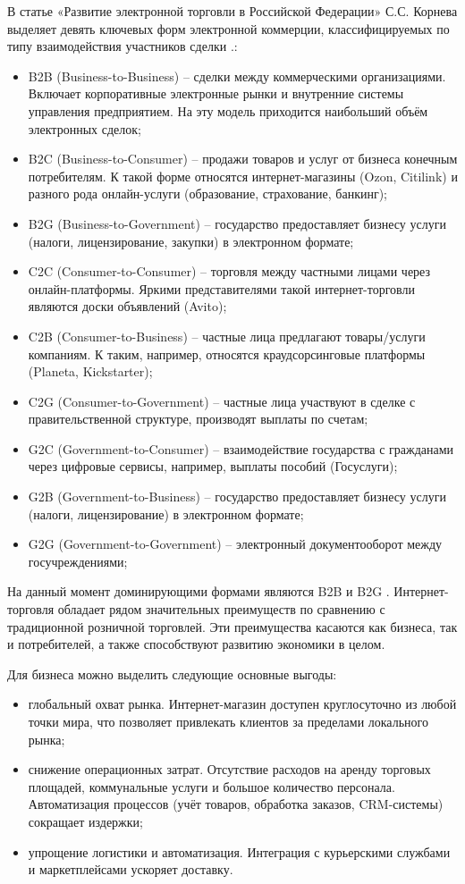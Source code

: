 В статье «Развитие электронной торговли в Российской Федерации» С.С. Корнева выделяет девять ключевых форм электронной коммерции, классифицируемых по типу взаимодействия участников сделки \cite{2}.:
\begin{itemize}
	\item B2B (Business-to-Business) – сделки между коммерческими организациями. Включает корпоративные электронные рынки и внутренние системы управления предприятием. На эту модель приходится наибольший объём электронных сделок;
	\item B2C (Business-to-Consumer) – продажи товаров и услуг от бизнеса конечным потребителям. К такой форме относятся интернет-магазины (Ozon, Citilink) и разного рода онлайн-услуги (образование, страхование, банкинг);
	\item B2G (Business-to-Government) – государство предоставляет бизнесу услуги (налоги, лицензирование, закупки) в электронном формате;
	\item C2C (Consumer-to-Consumer) – торговля между частными лицами через онлайн-платформы. Яркими представителями такой интернет-торговли являются доски объявлений (Avito);
	\item C2B (Consumer-to-Business) – частные лица предлагают товары/услуги компаниям. К таким, например, относятся краудсорсинговые платформы (Planeta, Kickstarter);
	\item C2G (Consumer-to-Government) – частные лица участвуют в сделке с правительственной структуре, производят выплаты по счетам;
	\item G2C (Government-to-Consumer) – взаимодействие государства с гражданами через цифровые сервисы, например, выплаты пособий (Госуслуги);
	\item G2B (Government-to-Business) – государство предоставляет бизнесу услуги (налоги, лицензирование) в электронном формате;
	\item G2G (Government-to-Government) – электронный документооборот между госучреждениями; 
 \end{itemize}
 
На данный момент доминирующими формами являются B2B и B2G \cite{2}.
Интернет-торговля обладает рядом значительных преимуществ по сравнению с традиционной розничной торговлей. Эти преимущества касаются как бизнеса, так и потребителей, а также способствуют развитию экономики в целом.

Для бизнеса можно выделить следующие основные выгоды:
 \begin{itemize}
 	\item глобальный охват рынка. Интернет-магазин доступен круглосуточно из любой точки мира, что позволяет привлекать клиентов за пределами локального рынка;
 	\item снижение операционных затрат. Отсутствие расходов на аренду торговых площадей, коммунальные услуги и большое количество персонала. Автоматизация процессов (учёт товаров, обработка заказов, CRM-системы) сокращает издержки;
 	\item упрощение логистики и автоматизация. Интеграция с курьерскими службами и маркетплейсами ускоряет доставку.
 \end{itemize}
 
